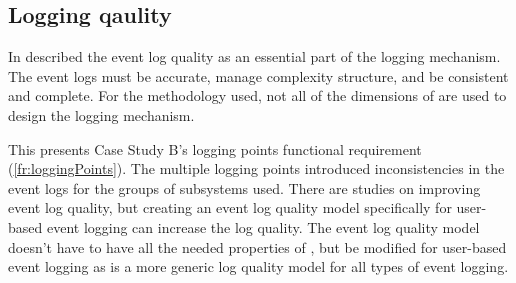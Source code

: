 \subsection{Logging qaulity}
In  described the event log quality as an essential part of the logging
mechanism. The event logs must be accurate, manage complexity structure, and be consistent and
complete. For the methodology used, not all of the dimensions of  are used
to design the logging mechanism.\par This presents Case Study B's logging points functional
requirement (\ref{fr:loggingPoints}). The multiple logging points introduced inconsistencies in the
event logs for the groups of subsystems used. There are studies on improving event log quality, but
creating an event log quality model specifically for user-based event logging can increase the log
quality. The event log quality model doesn't have to have all the needed properties of
, but be modified for user-based event logging as
 is a more generic log quality model for all types of event logging.

